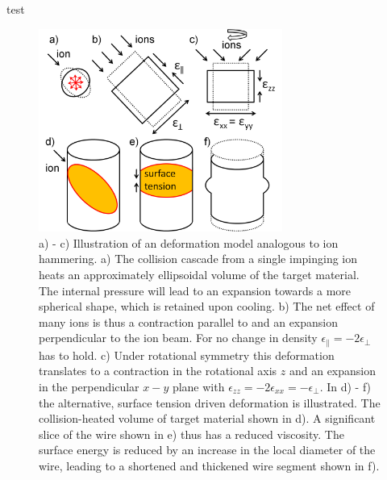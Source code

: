 \documentclass[12pt,
paper=a4,				
DIV=calc,		  %
BCOR=16mm,	  %
headinclude,
openany
]{scrbook}
\begin{document}
\clearpage
test



\begin{figure}[htbp]
	\centering
		\includegraphics[width=8cm]{images/deformationmodel.jpg}
	\caption{a) - c) Illustration of an deformation model analogous to ion hammering. a) The collision cascade from a single impinging ion heats an approximately ellipsoidal volume of the target material. The internal pressure will lead to an expansion towards a more spherical shape, which is retained upon cooling. b) The net effect of many ions is thus a contraction parallel to and an expansion perpendicular to the ion beam. For no change in density $\epsilon_\parallel = -2\epsilon_\perp$ has to hold. c) Under rotational symmetry this deformation translates to a contraction in the rotational axis $z$ and an expansion in the perpendicular $x-y$ plane with $\epsilon_{zz} = -2\epsilon_{xx} = -\epsilon_\perp$. In d) - f) the alternative, surface tension driven deformation is illustrated. The collision-heated volume of target material shown in d). A significant slice of the wire shown in e) thus has a reduced viscosity. The surface energy is reduced by an increase in the local diameter of the wire, leading to a shortened and thickened wire segment shown in f).} 
	\label{deformationmodel}
\end{figure}
\end{document}
